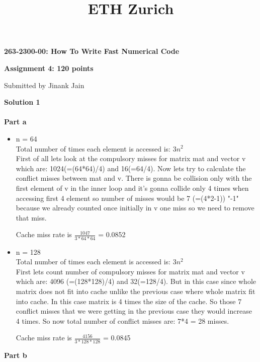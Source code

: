 \documentclass[letterpaper, 11pt]{article}
\title{ETH Zurich}
\begin{document}

\begin{center}
\Large \bf 263-2300-00: How To Write Fast Numerical Code

\Large \bf Assignment 4: 120 points

\large Submitted by Jinank Jain
\end{center}

\textbf{Solution 1}\\ \\
\textbf{Part a}
\begin{itemize}
\item n = 64 \\
Total number of times each element is accessed is: $3n^2$ \\
First of all lets look at the compulsory misses for matrix mat and vector v which are: 1024(=(64*64)/4) and 16(=64/4). Now lets try to calculate the conflict misses between mat and v. There is gonna be collision only with the first element of v in the inner loop and it's gonna collide only 4 times when accessing first 4 element so number of misses would be 7 (=(4*2-1)) "-1" because we already counted once initially in v one miss so we need to remove that miss.
\begin{center} Cache miss rate is $\frac{1047}{3*64*64}$ = 0.0852 \end{center}
\item n = 128 \\
Total number of times each element is accessed is: $3n^2$ \\
First lets count number of compulsory misses for matrix mat and vector v which are: 4096 (=(128*128)/4) and 32(=128/4). But in this case since whole matrix does not fit into cache unlike the previous case where whole matrix fit into cache. In this case matrix is 4 times the size of the cache. So those 7 conflict misses that we were getting in the previous case they would increase 4 times. So now total number of conflict misses are: 7*4 = 28 misses.
\begin{center}Cache miss rate is $\frac{4156}{3*128*128}$ = 0.0845 \end{center}
\end{itemize}
\textbf{Part b}
\end{document}
